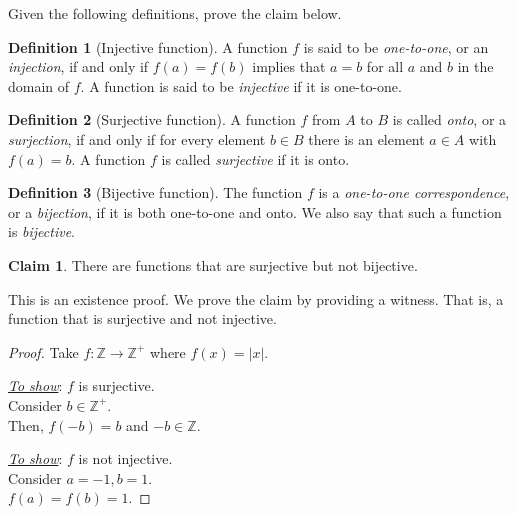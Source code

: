 \documentclass[addpoints]{exam}
\theoremstyle{definition}
\newtheorem{definition}{Definition}[section]
\theoremstyle{claim}
\newtheorem{claim}{Claim}
\newcommand\Z{\ensuremath{\mathbb{Z}}}
\begin{document}
\begin{questions}
\question[10] Given the following definitions, prove the claim below.

  \begin{definition}[Injective function]
    A function $f$ is said to be \textit{one-to-one}, or an \textit{injection}, if and only if $f (a) = f (b)$ implies that $a = b$ for all $a$ and $b$ in the domain of $f$. A function is said to be \textit{injective} if it is one-to-one.
  \end{definition}

  \begin{definition}[Surjective function]
    A function $f$ from $A$ to $B$ is called \textit{onto}, or a \textit{surjection}, if and only if for every element $b \in B$ there is an element $a \in A$ with $f(a) = b$. A function $f$ is called \textit{surjective} if it is onto.
  \end{definition}

  \begin{definition}[Bijective function]
    The function $f$ is a \textit{one-to-one correspondence}, or a \textit{bijection}, if it is both one-to-one and onto. We also say that such a function is \textit{bijective}.
  \end{definition}

  \begin{claim}
    There are functions that are surjective but not bijective.
  \end{claim}

  \begin{solution}
    This is an existence proof. We prove the claim by providing a witness. That is, a function that is surjective and not injective.
    \begin{proof}
      Take $f:\Z\to\Z^+$ where $f(x)=|x|$.

      \underline{\textit{To show}}: $f$ is surjective.\\
      Consider $b\in\Z^+$.\\
      Then, $f(-b)=b$ and $-b\in\Z$.

      \underline{\textit{To show}}: $f$ is not injective.\\
      Consider $a=-1,b=1$.\\
      $f(a)=f(b)=1$.
    \end{proof}
  \end{solution}

\end{questions}
\end{document}
